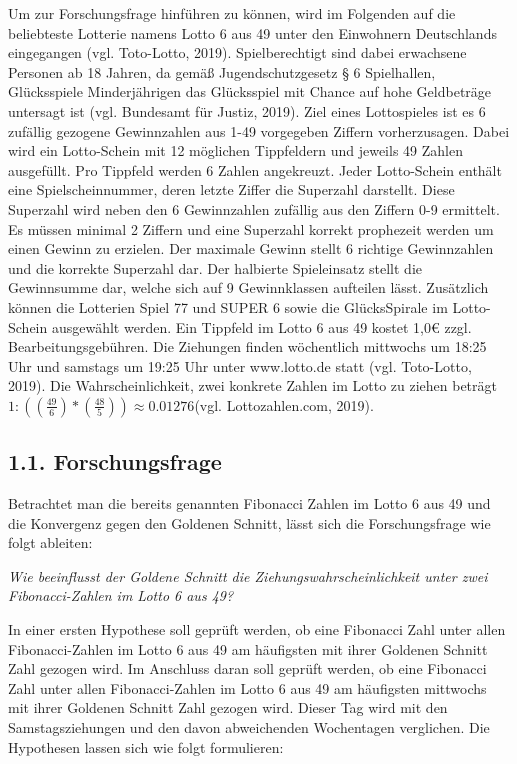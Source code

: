 \documentclass[ngerman,]{article}
\newcommand{\euro}{€}
\begin{document}
Um zur Forschungsfrage hinführen zu können, wird im Folgenden auf die
beliebteste Lotterie namens Lotto 6 aus 49 unter den Einwohnern
Deutschlands eingegangen (vgl. Toto-Lotto, 2019). Spielberechtigt sind
dabei erwachsene Personen ab 18 Jahren, da gemäß Jugendschutzgesetz § 6
Spielhallen, Glücksspiele Minderjährigen das Glücksspiel mit Chance auf
hohe Geldbeträge untersagt ist (vgl. Bundesamt für Justiz, 2019). Ziel
eines Lottospieles ist es 6 zufällig gezogene Gewinnzahlen aus 1-49
vorgegeben Ziffern vorherzusagen. Dabei wird ein Lotto-Schein mit 12
möglichen Tippfeldern und jeweils 49 Zahlen ausgefüllt. Pro Tippfeld
werden 6 Zahlen angekreuzt. Jeder Lotto-Schein enthält eine
Spielscheinnummer, deren letzte Ziffer die Superzahl darstellt. Diese
Superzahl wird neben den 6 Gewinnzahlen zufällig aus den Ziffern 0-9
ermittelt. Es müssen minimal 2 Ziffern und eine Superzahl korrekt
prophezeit werden um einen Gewinn zu erzielen. Der maximale Gewinn
stellt 6 richtige Gewinnzahlen und die korrekte Superzahl dar. Der
halbierte Spieleinsatz stellt die Gewinnsumme dar, welche sich auf 9
Gewinnklassen aufteilen lässt. Zusätzlich können die Lotterien Spiel 77
und SUPER 6 sowie die GlücksSpirale im Lotto-Schein ausgewählt werden.
Ein Tippfeld im Lotto 6 aus 49 kostet 1,0\euro{} zzgl.
Bearbeitungsgebühren. Die Ziehungen finden wöchentlich mittwochs um
18:25 Uhr und samstags um 19:25 Uhr unter www.lotto.de statt (vgl.
Toto-Lotto, 2019). Die Wahrscheinlichkeit, zwei konkrete Zahlen im Lotto
zu ziehen beträgt
\(1:((\frac{49}{6})*(\frac{48}{5}))\approx0.01276\)(vgl.
Lottozahlen.com, 2019).

\subsection{1.1. Forschungsfrage}\label{forschungsfrage}

Betrachtet man die bereits genannten Fibonacci Zahlen im Lotto 6 aus 49
und die Konvergenz gegen den Goldenen Schnitt, lässt sich die
Forschungsfrage wie folgt ableiten:

\emph{Wie beeinflusst der Goldene Schnitt die Ziehungswahrscheinlichkeit
unter zwei Fibonacci-Zahlen im Lotto 6 aus 49?}

In einer ersten Hypothese soll geprüft werden, ob eine Fibonacci Zahl
unter allen Fibonacci-Zahlen im Lotto 6 aus 49 am häufigsten mit ihrer
Goldenen Schnitt Zahl gezogen wird. Im Anschluss daran soll geprüft
werden, ob eine Fibonacci Zahl unter allen Fibonacci-Zahlen im Lotto 6
aus 49 am häufigsten mittwochs mit ihrer Goldenen Schnitt Zahl gezogen
wird. Dieser Tag wird mit den Samstagsziehungen und den davon
abweichenden Wochentagen verglichen. Die Hypothesen lassen sich wie
folgt formulieren:
\end{document}
